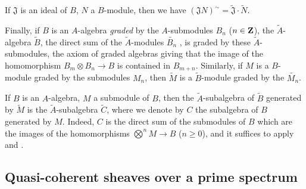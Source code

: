 \begin{env}[1.3.13]
If $\mathfrak{J}$ is an ideal of $B$, $N$ a $B$-module, then we have
$(\mathfrak{J}N)^\sim=\widetilde{\mathfrak{J}}\cdot\widetilde{N}$.

Finally, if $B$ is an $A$-algebra {\em graded} by the $A$-submodules $B_n$ ($n\in\mathbf{Z}$),
the $\widetilde{A}$-algebra $\widetilde{B}$, the direct sum of the $\widetilde{A}$-modules
$\widetilde{B_n}$ , is graded by these $\widetilde{A}$-submodules, the axiom
of graded algebras giving that the image of the homomorphism $B_m\otimes B_n\to B$ is
contained in $B_{m+n}$. Similarly, if $M$ is a $B$-module graded by the submodules $M_n$,
then $\widetilde{M}$ is a $\widetilde{B}$-module graded by the $\widetilde{M_n}$.
\end{env}

\begin{env}[1.3.14]
\label{1.1.3.14}
If $B$ is an $A$-algebra, $M$ a submodule of $B$, then the $\widetilde{A}$-subalgebra of
$\widetilde{B}$ generated by $\widetilde{M}$  is the
$\widetilde{A}$-subalgebra $\widetilde{C}$, where we denote by $C$ the subalgebra of $B$
generated by $M$. Indeed, $C$ is the direct sum of the submodules of $B$ which are the images
of the homomorphisms $\bigotimes^n M\to B$ ($n\geqslant 0$), and it suffices to apply
 and .
\end{env}

\subsection{Quasi-coherent sheaves over a prime spectrum}
\label{subsection-qcoh-sheaves-over-spec}

